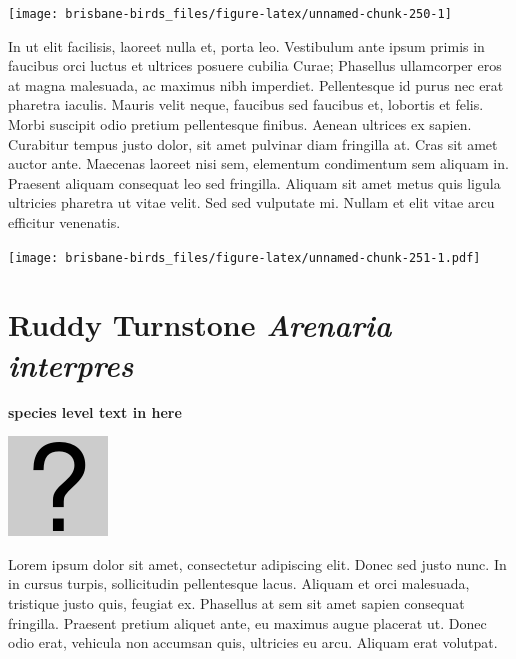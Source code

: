 \documentclass[]{book}
\let\origfigure\figure
\let\endorigfigure\endfigure
\renewenvironment{figure}[1][2] {
  \expandafter\origfigure\expandafter[H]
} {
  \endorigfigure
}
\begin{document}
\begin{figure}
\texttt{[image: brisbane-birds\_files/figure-latex/unnamed-chunk-250-1]} \caption{insert figure caption}\label{fig:unnamed-chunk-250}
\end{figure}

In ut elit facilisis, laoreet nulla et, porta leo. Vestibulum ante ipsum
primis in faucibus orci luctus et ultrices posuere cubilia Curae;
Phasellus ullamcorper eros at magna malesuada, ac maximus nibh
imperdiet. Pellentesque id purus nec erat pharetra iaculis. Mauris velit
neque, faucibus sed faucibus et, lobortis et felis. Morbi suscipit odio
pretium pellentesque finibus. Aenean ultrices ex sapien. Curabitur
tempus justo dolor, sit amet pulvinar diam fringilla at. Cras sit amet
auctor ante. Maecenas laoreet nisi sem, elementum condimentum sem
aliquam in. Praesent aliquam consequat leo sed fringilla. Aliquam sit
amet metus quis ligula ultricies pharetra ut vitae velit. Sed sed
vulputate mi. Nullam et elit vitae arcu efficitur venenatis.

\begin{figure}
\centering
\texttt{[image: brisbane-birds\_files/figure-latex/unnamed-chunk-251-1.pdf]}
\caption{\label{fig:unnamed-chunk-251}insert figure caption}
\end{figure}

\section{\texorpdfstring{Ruddy Turnstone \emph{Arenaria
interpres}}{Ruddy Turnstone Arenaria interpres}}\label{ruddy-turnstone-arenaria-interpres}

\textbf{species level text in here}

\begin{figure}
\centering
\includegraphics{assets/missing.png}
\caption{No image for species}
\end{figure}

Lorem ipsum dolor sit amet, consectetur adipiscing elit. Donec sed justo
nunc. In in cursus turpis, sollicitudin pellentesque lacus. Aliquam et
orci malesuada, tristique justo quis, feugiat ex. Phasellus at sem sit
amet sapien consequat fringilla. Praesent pretium aliquet ante, eu
maximus augue placerat ut. Donec odio erat, vehicula non accumsan quis,
ultricies eu arcu. Aliquam erat volutpat.
\end{document}
